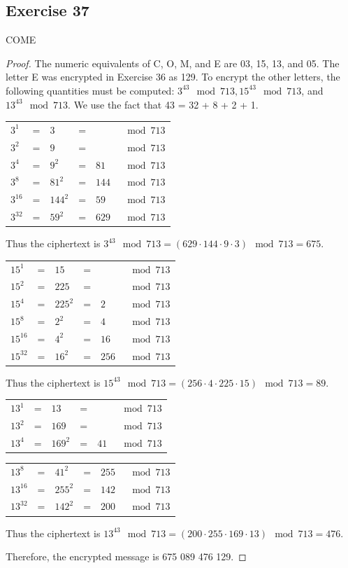 \documentclass[14pt]{extarticle}
\begin{document}
\subsection{Exercise 37}
COME
\begin{proof}
The numeric equivalents of C, O, M, and E are 03, 15, 13, and 05. The letter E was encrypted in Exercise 36 as 129. 
To encrypt the other letters, the following quantities must be computed: \(3^{43} \mod 713, 15^{43} \mod 713\), and 
\(13^{43} \mod 713\). We use the fact that 43 = 32 + 8 + 2 + 1.

\begin{tabular}{lclcll}
\(3^1\)&=&\(3\)&=&\(\)&\(\mod 713\) \\
\(3^2\)&=&\(9\)&=&\(\)&\(\mod 713\) \\
\(3^4\)&=&\(9^2\)&=&\(81\)&\(\mod 713\) \\
\(3^8\)&=&\(81^2\)&=&\(144\)&\(\mod 713\) \\
\(3^{16}\)&=&\(144^2\)&=&\(59\)&\(\mod 713\) \\
\(3^{32}\)&=&\(59^2\)&=&\(629\)&\(\mod 713\) 
\end{tabular}

Thus the ciphertext is \(3^{43} \mod 713 = (629 \cdot 144 \cdot 9 \cdot 3) \mod 713 = 675\).

\begin{tabular}{lclcll}
\(15^1\)&=&\(15\)&=&\(\)&\(\mod 713\) \\
\(15^2\)&=&\(225\)&=&\(\)&\(\mod 713\) \\
\(15^4\)&=&\(225^2\)&=&\(2\)&\(\mod 713\) \\
\(15^8\)&=&\(2^2\)&=&\(4\)&\(\mod 713\) \\
\(15^{16}\)&=&\(4^2\)&=&\(16\)&\(\mod 713\) \\
\(15^{32}\)&=&\(16^2\)&=&\(256\)&\(\mod 713\) 
\end{tabular}

Thus the ciphertext is \(15^{43} \mod 713 = (256 \cdot 4 \cdot 225 \cdot 15) \mod 713 = 89\).

\begin{tabular}{lclcll}
\(13^1\)&=&\(13\)&=&\(\)&\(\mod 713\) \\
\(13^2\)&=&\(169\)&=&\(\)&\(\mod 713\) \\
\(13^4\)&=&\(169^2\)&=&\(41\)&\(\mod 713\) \\
\end{tabular}

\begin{tabular}{lclcll}
\(13^8\)&=&\(41^2\)&=&\(255\)&\(\mod 713\) \\
\(13^{16}\)&=&\(255^2\)&=&\(142\)&\(\mod 713\) \\
\(13^{32}\)&=&\(142^2\)&=&\(200\)&\(\mod 713\) 
\end{tabular}

Thus the ciphertext is \(13^{43} \mod 713 = (200 \cdot 255 \cdot 169 \cdot 13) \mod 713 = 476\).

Therefore, the encrypted message is 675 089 476 129.
\end{proof}
\end{document}
